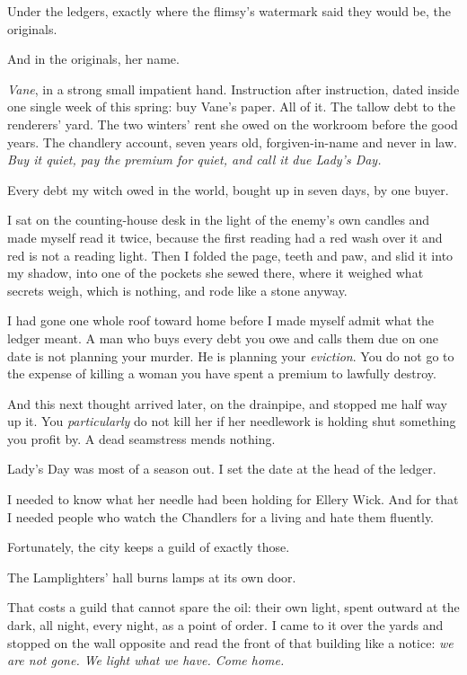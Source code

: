 Under the ledgers, exactly where the flimsy's watermark said they would be, the originals.

And in the originals, her name.

\emph{Vane}, in a strong small impatient hand. Instruction after instruction, dated inside one single week of this spring: buy Vane's paper. All of it. The tallow debt to the renderers' yard. The two winters' rent she owed on the workroom before the good years. The chandlery account, seven years old, forgiven-in-name and never in law. \emph{Buy it quiet, pay the premium for quiet, and call it due Lady's Day.}

Every debt my witch owed in the world, bought up in seven days, by one buyer.

I sat on the counting-house desk in the light of the enemy's own candles and made myself read it twice, because the first reading had a red wash over it and red is not a reading light. Then I folded the page, teeth and paw, and slid it into my shadow, into one of the pockets she sewed there, where it weighed what secrets weigh, which is nothing, and rode like a stone anyway.

I had gone one whole roof toward home before I made myself admit what the ledger meant. A man who buys every debt you owe and calls them due on one date is not planning your murder. He is planning your \emph{eviction}. You do not go to the expense of killing a woman you have spent a premium to lawfully destroy.

And this next thought arrived later, on the drainpipe, and stopped me half way up it. You \emph{particularly} do not kill her if her needlework is holding shut something you profit by. A dead seamstress mends nothing.

Lady's Day was most of a season out. I set the date at the head of the ledger.

I needed to know what her needle had been holding for Ellery Wick. And for that I needed people who watch the Chandlers for a living and hate them fluently.

Fortunately, the city keeps a guild of exactly those.

\scenebreak

The Lamplighters' hall burns lamps at its own door.

That costs a guild that cannot spare the oil: their own light, spent outward at the dark, all night, every night, as a point of order. I came to it over the yards and stopped on the wall opposite and read the front of that building like a notice: \emph{we are not gone. We light what we have. Come home.}

